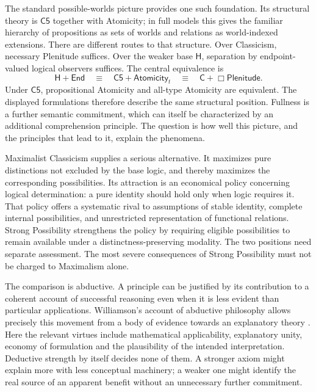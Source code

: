 \documentclass[12pt,letterpaper]{article}
\newcommand{\Hlogic}{\mathsf H}
\newcommand{\C}{\mathsf C}
\newcommand{\Cfive}{\mathsf{C5}}
\newcommand{\EndSep}{\mathsf{End}}
\newcommand{\Plen}{\mathsf{Plenitude}}
\newcommand{\At}{\mathsf{Atomicity}}
\begin{document}
The standard possible-worlds picture provides one such foundation. Its structural theory is $\Cfive$ together with Atomicity; in full models this gives the familiar hierarchy of propositions as sets of worlds and relations as world-indexed extensions. There are different routes to that structure. Over Classicism, necessary Plenitude suffices. Over the weaker base $\Hlogic$, separation by endpoint-valued logical observers suffices. The central equivalence is
\begin{equation}\label{eq:structural}
 \Hlogic+\EndSep
 \quad\equiv\quad
 \Cfive+\At_t
 \quad\equiv\quad
 \C+\Box\Plen.
\end{equation}
Under $\Cfive$, propositional Atomicity and all-type Atomicity are equivalent. The displayed formulations therefore describe the same structural position. Fullness is a further semantic commitment, which can itself be characterized by an additional comprehension principle. The question is how well this picture, and the principles that lead to it, explain the phenomena.

Maximalist Classicism supplies a serious alternative. It maximizes pure distinctions not excluded by the base logic, and thereby maximizes the corresponding possibilities. Its attraction is an economical policy concerning logical determination: a pure identity should hold only when logic requires it. That policy offers a systematic rival to assumptions of stable identity, complete internal possibilities, and unrestricted representation of functional relations. Strong Possibility strengthens the policy by requiring eligible possibilities to remain available under a distinctness-preserving modality. The two positions need separate assessment. The most severe consequences of Strong Possibility must not be charged to Maximalism alone.

The comparison is abductive. A principle can be justified by its contribution to a coherent account of successful reasoning even when it is less evident than particular applications. Williamson's account of abductive philosophy allows precisely this movement from a body of evidence towards an explanatory theory \citep[pp.~266, 270--273]{williamson2016}. Here the relevant virtues include mathematical applicability, explanatory unity, economy of formulation and the plausibility of the intended interpretation. Deductive strength by itself decides none of them. A stronger axiom might explain more with less conceptual machinery; a weaker one might identify the real source of an apparent benefit without an unnecessary further commitment.
\end{document}
